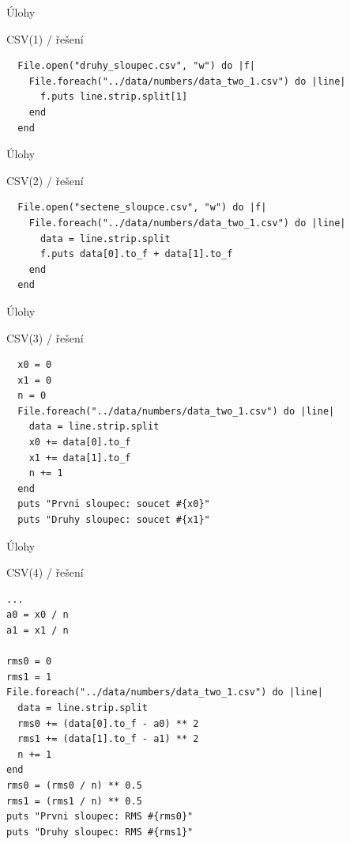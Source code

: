\documentclass{beamer}
\begin{document}
\begin{frame}[fragile]{Úlohy}
  \begin{block}{CSV(1) / řešení}
    \scriptsize
\begin{verbatim}
  File.open("druhy_sloupec.csv", "w") do |f|
    File.foreach("../data/numbers/data_two_1.csv") do |line|
      f.puts line.strip.split[1]
    end
  end
\end{verbatim}
  \end{block}
\end{frame}

\begin{frame}[fragile]{Úlohy}
  \begin{block}{CSV(2) / řešení}
    \scriptsize
\begin{verbatim}
  File.open("sectene_sloupce.csv", "w") do |f|
    File.foreach("../data/numbers/data_two_1.csv") do |line|
      data = line.strip.split
      f.puts data[0].to_f + data[1].to_f
    end
  end
\end{verbatim}
  \end{block}
\end{frame}

\begin{frame}[fragile]{Úlohy}
  \begin{block}{CSV(3) / řešení}
    \scriptsize
\begin{verbatim}
  x0 = 0
  x1 = 0
  n = 0
  File.foreach("../data/numbers/data_two_1.csv") do |line|
    data = line.strip.split
    x0 += data[0].to_f
    x1 += data[1].to_f
    n += 1
  end
  puts "Prvni sloupec: soucet #{x0}"
  puts "Druhy sloupec: soucet #{x1}"
\end{verbatim}
  \end{block}
\end{frame}

\begin{frame}[fragile]{Úlohy}
  \begin{block}{CSV(4) / řešení}
    \scriptsize
\begin{verbatim}
...
a0 = x0 / n
a1 = x1 / n

rms0 = 0
rms1 = 1
File.foreach("../data/numbers/data_two_1.csv") do |line|
  data = line.strip.split
  rms0 += (data[0].to_f - a0) ** 2
  rms1 += (data[1].to_f - a1) ** 2
  n += 1
end
rms0 = (rms0 / n) ** 0.5
rms1 = (rms1 / n) ** 0.5
puts "Prvni sloupec: RMS #{rms0}"
puts "Druhy sloupec: RMS #{rms1}"
\end{verbatim}
  \end{block}
\end{frame}
\end{document}
